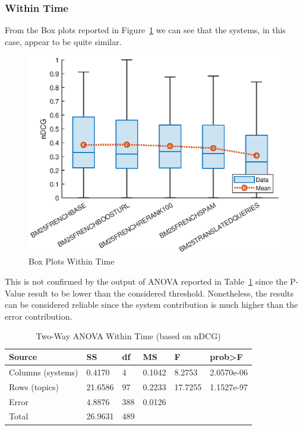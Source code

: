 \subsubsection{Within Time}
\label{subsubsec:wt}
From the Box plots reported in Figure~\ref{fig:WTBP} we can see that the systems, in this case, appear to be quite similar.
\begin{figure}[tb]
    \centering
    \includegraphics[scale=0.8]{figure/heldout/boxplot.eps}
    \caption{Box Plots Within Time}
    \label{fig:WTBP}
\end{figure}
This is not confirmed by the output of \ac{ANOVA} reported in Table~\ref{tab:WTANOVA} since the P-Value result to be lower than the considered threshold. Nonetheless, the results can be considered reliable since the system contribution is much higher than the error contribution.
\begin{table}[tb]
  \caption{Two-Way ANOVA Within Time (based on nDCG)}
  \label{tab:WTANOVA}
  \centering
  \begin{tabular}{|l|l|l|l|l|l|}
    \toprule
    Source & SS & df & MS & F & prob>F\\
    \midrule
    Columns (systems) & 0.4170 & 4 & 0.1042 & 8.2753 & 2.0570e-06\\
    Rows (topics) & 21.6586 & 97 & 0.2233 & 17.7255 & 1.1527e-97\\
    Error & 4.8876 & 388 & 0.0126 &  & \\
    Total & 26.9631 & 489 &  &  & \\
  \bottomrule
\end{tabular}
\end{table}

